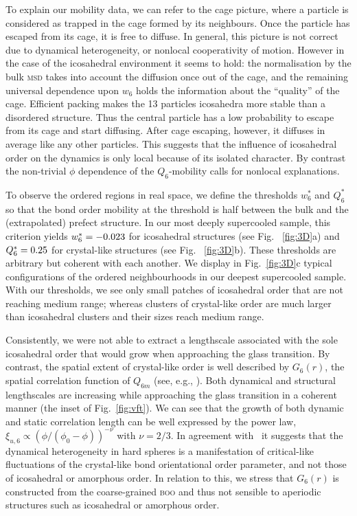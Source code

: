 To explain our mobility data, we can refer to the cage picture, where a particle is considered as trapped in the cage formed by its neighbours. Once the particle has escaped from its cage, it is free to diffuse. In general, this picture is not correct due to dynamical heterogeneity, or nonlocal cooperativity of motion. However in the case of the icosahedral environment it seems to hold: the normalisation by the bulk \textsc{msd} takes into account the diffusion once out of the cage, and the remaining universal dependence upon $w_6$ holds the information about the ``quality'' of the cage. Efficient packing makes the 13 particles icosahedra more stable than a disordered structure. Thus the central particle has a low probability to escape from its cage and start diffusing. After cage escaping, however, it diffuses in average like any other particles. This suggests that the influence of icosahedral order on the dynamics is only local because of its isolated character. By contrast the non-trivial $\phi$ dependence of the $Q_6$-mobility calls for nonlocal explanations.

To observe the ordered regions in real space, we define the thresholds $w_6^*$ and $Q_6^*$ so that the bond order mobility at the threshold is half between the bulk and the (extrapolated) prefect structure. In our most deeply supercooled sample, this criterion yields $w_6^* = -0.023$ for icosahedral structures (see Fig. ~\ref{fig:3D}a) and $Q_6^* = 0.25$ for crystal-like structures (see Fig. ~\ref{fig:3D}b). These thresholds are arbitrary but coherent with each another. We display in Fig.~\ref{fig:3D}c typical configurations of the ordered neighbourhoods in our deepest supercooled sample. With our thresholds, we see only small patches of icosahedral order that are not reaching medium range; whereas clusters of crystal-like order are much larger than icosahedral clusters and their sizes reach medium range. 



Consistently, we were not able to extract a lengthscale associated with the sole icosahedral order that would grow when approaching the glass transition. By contrast, the spatial extent of crystal-like order is well described by $G_6(r)$, the spatial correlation function of $Q_{6 m}$ (see, e.g., \cite{tanaka2010critical}). Both dynamical and structural lengthscales are increasing while approaching the glass transition in a coherent manner (the inset of Fig.~\ref{fig:vft}). We can see that the growth of both dynamic and static correlation length can be well expressed by the power law,   $\xi_{u,6} \propto (\phi/(\phi_0-\phi))^{-\nu}$ with $\nu=2/3$. In agreement with~\citep{tanaka2010critical} it suggests that the dynamical heterogeneity in hard spheres is a manifestation of critical-like fluctuations of the crystal-like bond orientational order parameter, and not those of icosahedral or amorphous order. In relation to this, we stress that $G_6(r)$ is constructed from the coarse-grained \textsc{boo} and thus not sensible to aperiodic structures such as icosahedral or amorphous order. 

